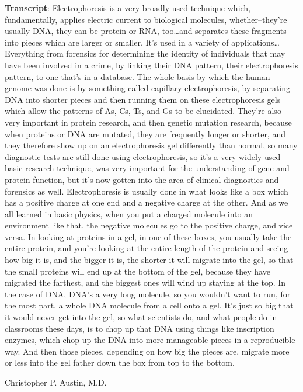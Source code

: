 \documentclass[
]{book}
\begin{document}
\textbf{Transcript}: Electrophoresis is a very broadly used technique which, fundamentally, applies electric current to biological molecules, whether--they're usually DNA, they can be protein or RNA, too\ldots and separates these fragments into pieces which are larger or smaller. It's used in a variety of applications\ldots{} Everything from forensics for determining the identity of individuals that may have been involved in a crime, by linking their DNA pattern, their electrophoresis pattern, to one that's in a database. The whole basis by which the human genome was done is by something called capillary electrophoresis, by separating DNA into shorter pieces and then running them on these electrophoresis gels which allow the patterns of As, Cs, Ts, and Gs to be elucidated. They're also very important in protein research, and then genetic mutation research, because when proteins or DNA are mutated, they are frequently longer or shorter, and they therefore show up on an electrophoresis gel differently than normal, so many diagnostic tests are still done using electrophoresis, so it's a very widely used basic research technique, was very important for the understanding of gene and protein function, but it's now gotten into the area of clinical diagnostics and forensics as well. Electrophoresis is usually done in what looks like a box which has a positive charge at one end and a negative charge at the other. And as we all learned in basic physics, when you put a charged molecule into an environment like that, the negative molecules go to the positive charge, and vice versa. In looking at proteins in a gel, in one of these boxes, you usually take the entire protein, and you're looking at the entire length of the protein and seeing how big it is, and the bigger it is, the shorter it will migrate into the gel, so that the small proteins will end up at the bottom of the gel, because they have migrated the farthest, and the biggest ones will wind up staying at the top. In the case of DNA, DNA's a very long molecule, so you wouldn't want to run, for the most part, a whole DNA molecule from a cell onto a gel. It's just so big that it would never get into the gel, so what scientists do, and what people do in classrooms these days, is to chop up that DNA using things like inscription enzymes, which chop up the DNA into more manageable pieces in a reproducible way. And then those pieces, depending on how big the pieces are, migrate more or less into the gel father down the box from top to the bottom.

Christopher P. Austin, M.D.
\end{document}
